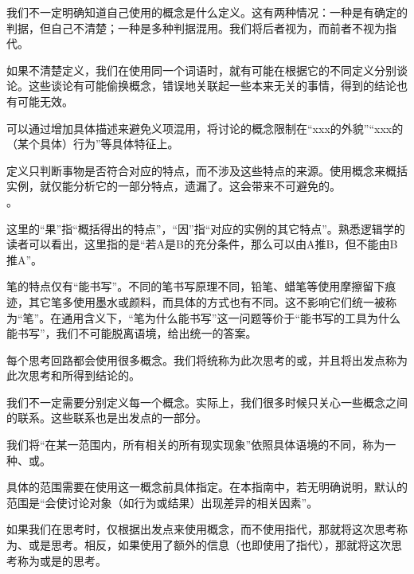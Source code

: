 我们不一定明确知道自己使用的概念是什么定义。这有两种情况：一种是有确定的判据，但自己不清楚；一种是多种判据混用。我们将后者视为，而前者不视为指代。
\begin{explain}
如果不清楚定义，我们在使用同一个词语时，就有可能在根据它的不同定义分别谈论。这些谈论有可能偷换概念，错误地关联起一些本来无关的事情，得到的结论也有可能无效。

可以通过增加具体描述来避免义项混用，将讨论的概念限制在“xxx的外貌”“xxx的（某个具体）行为”等具体特征上。
\end{explain}

定义只判断事物是否符合对应的特点，而不涉及这些特点的来源。使用概念来概括实例，就仅能分析它的一部分特点，遗漏了。这会带来不可避免的。\\
。
\begin{examples}
这里的“果”指“概括得出的特点”，“因”指“对应的实例的其它特点”。熟悉逻辑学的读者可以看出，这里指的是“若A是B的充分条件，那么可以由A推B，但不能由B推A”。

笔的特点仅有“能书写”。不同的笔书写原理不同，铅笔、蜡笔等使用摩擦留下痕迹，其它笔多使用墨水或颜料，而具体的方式也有不同。这不影响它们统一被称为“笔”。在通用含义下，“笔为什么能书写”这一问题等价于“能书写的工具为什么能书写”，我们不可能脱离语境，给出统一的答案。
\end{examples}
每个思考回路都会使用很多概念。我们将统称为此次思考的或，并且将出发点称为此次思考和所得到结论的。
\begin{explain}
我们不一定需要分别定义每一个概念。实际上，我们很多时候只关心一些概念之间的联系。这些联系也是出发点的一部分。
\end{explain}
我们将“在某一范围内，所有相关的所有现实现象”依照具体语境的不同，称为一种、或。
\begin{explain}
具体的范围需要在使用这一概念前具体指定。在本指南中，若无明确说明，默认的范围是“会使讨论对象（如行为或结果）出现差异的相关因素”。
\end{explain}
如果我们在思考时，仅根据出发点来使用概念，而不使用指代，那就将这次思考称为、或是思考。相反，如果使用了额外的信息（也即使用了指代），那就将这次思考称为或是的思考。
